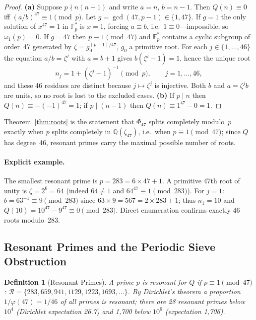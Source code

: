﻿\documentclass[11pt,a4paper]{article}
\newtheorem{definition}[theorem]{Definition}
\begin{document}
\begin{proof}
\textbf{(a)}  Suppose $p \nmid n(n{-}1)$ and write $a = n$, $b = n{-}1$.
Then $Q(n) \equiv 0$ iff $(a/b)^{47} \equiv 1 \pmod{p}$.
Let $g = \gcd(47, p{-}1) \in \{1, 47\}$.
If $g = 1$ the only solution of $x^{47} = 1$ in $\mathbb{F}_p^*$ is $x = 1$,
forcing $a \equiv b$, i.e.\ $1 \equiv 0$---impossible; so $\omega_1(p) = 0$.
If $g = 47$ then $p \equiv 1 \pmod{47}$ and $\mathbb{F}_p^*$ contains a cyclic
subgroup of order~47 generated by $\zeta = g_0^{(p-1)/47}$, $g_0$ a primitive root.
For each $j \in \{1, \ldots, 46\}$ the equation $a/b = \zeta^j$ with $a = b + 1$
gives $b(\zeta^j - 1) = 1$, hence the unique root
\begin{equation}\label{eq:roots}
  n_j = 1 + (\zeta^j - 1)^{-1} \pmod p, \qquad j = 1, \ldots, 46,
\end{equation}
and these 46 residues are distinct because $j \mapsto \zeta^j$ is injective.
Both $b$ and $a = \zeta^j b$ are units, so no root is lost to the excluded cases.
\textbf{(b)}  If $p \mid n$ then $Q(n) \equiv -(-1)^{47} = 1$; if $p \mid (n{-}1)$
then $Q(n) \equiv 1^{47} - 0 = 1$.
\end{proof}

Theorem~\ref{thm:roots} is the statement that $\Phi_{47}$ splits completely
modulo~$p$ exactly when $p$ splits completely in $\mathbb{Q}(\zeta_{47})$,
i.e.\ when $p \equiv 1 \pmod{47}$; since $Q$ has degree~46, resonant primes
carry the maximal possible number of roots.

\paragraph{Explicit example.}
The smallest resonant prime is $p = 283 = 6 \times 47 + 1$.
A primitive 47th root of unity is $\zeta = 2^{6} = 64$
(indeed $64 \neq 1$ and $64^{47} \equiv 1 \pmod{283}$).
For $j = 1$: $b = 63^{-1} \equiv 9 \pmod{283}$ since $63 \times 9 = 567 = 2 \times 283 + 1$;
thus $n_1 = 10$ and $Q(10) = 10^{47} - 9^{47} \equiv 0 \pmod{283}$.
Direct enumeration confirms exactly 46 roots modulo~283.

\subsection{Resonant Primes and the Periodic Sieve Obstruction}

\begin{definition}[Resonant Primes]
A prime $p$ is \emph{resonant} for $Q$ if $p \equiv 1 \pmod{47}$:
$\mathcal{R} = \{283, 659, 941, 1129, 1223, 1693, \ldots\}$.
By Dirichlet's theorem a proportion $1/\varphi(47) = 1/46$ of all primes is
resonant; there are 28 resonant primes below $10^4$ (Dirichlet expectation 26.7)
and 1{,}700 below $10^6$ (expectation 1{,}706).
\end{definition}
\end{document}
